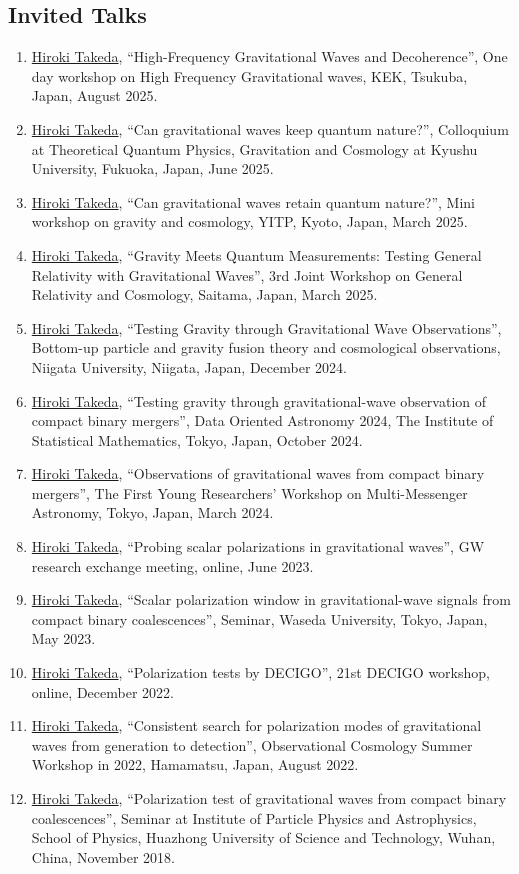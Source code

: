 \documentclass[uplatex, 12pt]{article}
\begin{document}
\subsection*{Invited Talks}
\begin{enumerate}
\item \uline{Hiroki Takeda}, “High-Frequency Gravitational Waves and Decoherence”, One day workshop on High Frequency Gravitational waves, KEK, Tsukuba, Japan, August 2025.
\item \uline{Hiroki Takeda}, “Can gravitational waves keep quantum nature?”, Colloquium at Theoretical Quantum Physics, Gravitation and Cosmology at Kyushu University, Fukuoka, Japan, June 2025.
\item \uline{Hiroki Takeda}, “Can gravitational waves retain quantum nature?”, Mini workshop on gravity and cosmology, YITP, Kyoto, Japan, March 2025.
\item \uline{Hiroki Takeda}, “Gravity Meets Quantum Measurements: Testing General Relativity with Gravitational Waves”, 3rd Joint Workshop on General Relativity and Cosmology, Saitama, Japan, March 2025.
\item \uline{Hiroki Takeda}, “Testing Gravity through Gravitational Wave Observations”, Bottom-up particle and gravity fusion theory and cosmological observations, Niigata University, Niigata, Japan, December 2024.
\item \uline{Hiroki Takeda}, “Testing gravity through gravitational-wave observation of compact binary mergers”, Data Oriented Astronomy 2024, The Institute of Statistical Mathematics, Tokyo, Japan, October 2024.
\item \uline{Hiroki Takeda}, “Observations of gravitational waves from compact binary mergers”, The First Young Researchers' Workshop on Multi-Messenger Astronomy, Tokyo, Japan, March 2024.
\item \uline{Hiroki Takeda}, “Probing scalar polarizations in gravitational waves”, GW research exchange meeting, online, June 2023.
\item \uline{Hiroki Takeda}, “Scalar polarization window in gravitational-wave signals from compact binary coalescences”, Seminar, Waseda University, Tokyo, Japan, May 2023.
\item \uline{Hiroki Takeda}, “Polarization tests by DECIGO”, 21st DECIGO workshop, online, December 2022.
\item \uline{Hiroki Takeda}, “Consistent search for polarization modes of gravitational waves from generation to detection”, Observational Cosmology Summer Workshop in 2022, Hamamatsu, Japan, August 2022.
\item \uline{Hiroki Takeda}, “Polarization test of gravitational waves from compact binary coalescences”, Seminar at Institute of Particle Physics and Astrophysics, School of Physics, Huazhong University of Science and Technology, Wuhan, China, November 2018.
\end{enumerate}
\end{document}
